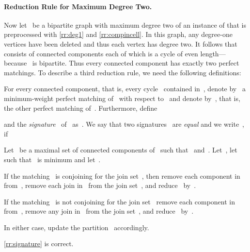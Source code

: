 \paragraph{Reduction Rule for Maximum Degree Two.}Now let~ be a bipartite graph with maximum degree two of an instance of \pCBMs{} that is preprocessed with \autoref{rr:deg1} and \autoref{rr:compincell}. In this graph, any degree-one vertices have been deleted and thus each vertex has degree two. It follows that~ consists of connected components each of which is a cycle of even length---because~ is bipartite. Thus every connected component has exactly two perfect matchings. To describe a third reduction rule, we need the following definitions:
\begin{definition}
  For every connected component, that is, every cycle~ contained in~, denote by~ a minimum-weight perfect matching of~ with respect to~ and denote by~, that is, the other perfect matching of~. Furthermore, define

and the \emph{signature}~ of~ as~. We say that two signatures~ are \emph{equal} and we write~, if

\end{definition}
\begin{rrule}\label{rr:signature}
  Let~ be a maximal set of connected components of~ such that~ and~. Let~, let~ such that~ is minimum and let~.\begin{lemenum}
  \item If the matching~ is conjoining for the join set~, then remove each component in~ from~, remove each join in~ from the join set~, and reduce~ by~.
  \item If the matching~ is not conjoining for the join set~ remove each component in~ from~, remove any join in~ from the join set~, and reduce~ by~. 
  \end{lemenum}

  In either case, update the partition~ accordingly.
\end{rrule}\begin{lemma}
  \autoref{rr:signature} is correct.
\end{lemma}
